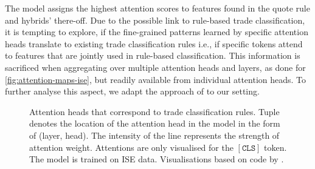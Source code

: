 The model assigns the highest attention scores to features found in the quote rule and hybrids' there-off. Due to the possible link to rule-based trade classification, it is tempting to explore, if the fine-grained patterns learned by specific attention heads translate to existing trade classification rules i.e., if specific tokens attend to features that are jointly used in rule-based classification. This information is sacrificed when aggregating over multiple attention heads and layers, as done for \cref{fig:attention-maps-ise}, but readily available from individual attention heads. To further analyse this aspect, we adapt the approach of \textcite[][4]{clarkWhatDoesBERT2019} to our setting.

\begin{figure}[h!]
    \hfill
    \hfill
    \caption[Attention Heads That Correspond To Trade Classification Rules]{Attention heads that correspond to trade classification rules. Tuple denotes the location of the attention head in the model in the form of (layer, head). The intensity of the line represents the strength of attention weight. Attentions are only visualised for the $\mathtt{[CLS]}$ token. The model is trained on \gls{ISE} data. Visualisations based on code by \textcite[][4]{clarkWhatDoesBERT2019}.}
    \label{fig:rule-like-attention-heads}
\end{figure}


